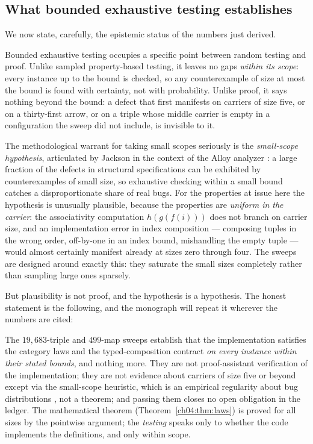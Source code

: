 \subsection{What bounded exhaustive testing establishes}
\label{ch04:sec:smallscope}

We now state, carefully, the epistemic status of the numbers just derived.

Bounded exhaustive testing occupies a specific point between random testing
and proof. Unlike sampled property-based testing, it leaves no gaps
\emph{within its scope}: every instance up to the bound is checked, so any
counterexample of size at most the bound is found with certainty, not with
probability. Unlike proof, it says nothing beyond the bound: a defect that
first manifests on carriers of size five, or on a thirty-first arrow, or on
a triple whose middle carrier is empty in a configuration the sweep did not
include, is invisible to it.

The methodological warrant for taking small scopes seriously is the
\emph{small-scope hypothesis}, articulated by Jackson in the context of the
Alloy analyzer \cite{jackson}: a large fraction of the defects in structural
specifications can be exhibited by counterexamples of small size, so
exhaustive checking within a small bound catches a disproportionate share of
real bugs. For the properties at issue here the hypothesis is unusually
plausible, because the properties are \emph{uniform in the carrier}: the
associativity computation $h(g(f(i)))$ does not branch on carrier size, and
an implementation error in index composition --- composing tuples in the
wrong order, off-by-one in an index bound, mishandling the empty tuple ---
would almost certainly manifest already at sizes zero through four. The
sweeps are designed around exactly this: they saturate the small sizes
completely rather than sampling large ones sparsely.

But plausibility is not proof, and the hypothesis is a hypothesis. The
honest statement is the following, and the monograph will repeat it wherever
the numbers are cited:

\begin{boundary}
\label{ch04:bound:testing}
The $19{,}683$-triple and $499$-map sweeps establish that the implementation
satisfies the category laws and the typed-composition contract \emph{on
every instance within their stated bounds}, and nothing more. They are not
proof-assistant verification of the implementation; they are not evidence
about carriers of size five or beyond except via the small-scope heuristic,
which is an empirical regularity about bug distributions
\cite{jackson}, not a theorem; and passing them closes no open obligation in
the ledger. The mathematical theorem (Theorem~\ref{ch04:thm:laws}) is proved
for all sizes by the pointwise argument; the \emph{testing} speaks only to
whether the code implements the definitions, and only within scope.
\end{boundary}

